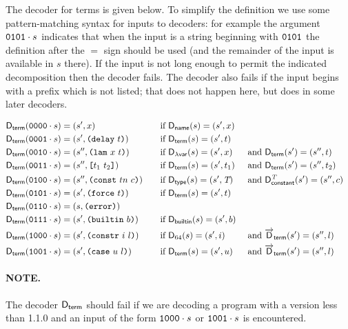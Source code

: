 \noindent The decoder for terms is given below.  To simplify the definition we
use some pattern-matching syntax for inputs to decoders: for example the
argument $\mathtt{0101} \cdot s$ indicates that when the input is a string
beginning with $\mathtt{0101}$ the definition after the $=$ sign should be used
(and the remainder of the input is available in $s$ there).  If the input is not
long enough to permit the indicated decomposition then the decoder fails.  The
decoder also fails if the input begins with a prefix which is not listed; that
does not happen here, but does in some later decoders.

\begin{alignat*}{5}
  \Dterm(\bits{0000} \cdot s)  &= (s', x) &&\quad \text{if } \Dname(s) = (s', x) \\
  \Dterm(\bits{0001} \cdot s)  &= (s', \Delay{t})  &&\quad \text{if}\ \Dterm(s) = (s', t) \\
  \Dterm(\bits{0010} \cdot s)  &= (s'', \Lam{x}{t})  &&\quad \text{if}\ \Dbinder(s) = (s', x)
                                                           &&\ \text{and}\ \Dterm(s') = (s'', t) \\
  \Dterm(\bits{0011} \cdot s)  &= (s'', \Apply{t_1}{t_2}) &&\quad \text{if}\ \Dterm(s) = (s', t_1)
                                                  &&\ \text{and}\ \Dterm(s') = (s'', t_2) \\
  \Dterm(\bits{0100} \cdot s)  &= (s'', \Const{tn}{c}) &&\quad \text{if}\ \Dtype(s) = (s', \tn)
                                                           &&\ \text{and}\ \dConstant{\tn}(s') =(s'', c) \\
  \Dterm(\bits{0101} \cdot s)  &= (s', \Force{t})  &&\quad \text{if}\ \Dterm(s) = (s', t) \\
  \Dterm(\bits{0110} \cdot s)  &= (s, \Error)  && \\
  \Dterm(\bits{0111} \cdot s)  &= (s', \Builtin{b}) &&\quad \text{if } \Dbuiltin(s) = (s', b) \\
  \Dterm(\bits{1000} \cdot s)  &= (s', \Constr{i}{l}) &&\quad \text{if } \D_{64}(s) = (s', i) &&\ \text{and}\ \Dlist_{\mathsf{term}}(s') = (s'', l)\\
  \Dterm(\bits{1001} \cdot s)  &= (s', \Kase{u}{l}) &&\quad \text{if } \Dterm(s) = (s', u) &&\ \text{and}\ \Dlist_{\mathsf{term}}(s') = (s'', l)
\end{alignat*}

\paragraph{NOTE.} The decoder $\mathsf{D}_{\mathsf{term}}$ should fail if we are decoding a program
with a version less than 1.1.0 and an input of the form $\mathtt{1000} \cdot s$ or
$\mathtt{1001} \cdot s$ is encountered.


